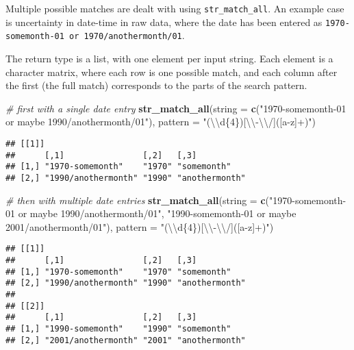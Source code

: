 \documentclass[
]{book}
\newenvironment{Shaded}{}{}
\newcommand{\CharTok}[1]{\textcolor[rgb]{0.25,0.44,0.63}{#1}}
\newcommand{\CommentTok}[1]{\textcolor[rgb]{0.38,0.63,0.69}{\textit{#1}}}
\newcommand{\DataTypeTok}[1]{\textcolor[rgb]{0.56,0.13,0.00}{#1}}
\newcommand{\KeywordTok}[1]{\textcolor[rgb]{0.00,0.44,0.13}{\textbf{#1}}}
\newcommand{\NormalTok}[1]{#1}
\newcommand{\StringTok}[1]{\textcolor[rgb]{0.25,0.44,0.63}{#1}}
\begin{document}
Multiple possible matches are dealt with using \texttt{str\_match\_all}. An example case is uncertainty in date-time in raw data, where the date has been entered as \texttt{1970-somemonth-01\ or\ 1970/anothermonth/01}.

The return type is a list, with one element per input string. Each element is a character matrix, where each row is one possible match, and each column after the first (the full match) corresponds to the parts of the search pattern.

\begin{Shaded}
\begin{Highlighting}[]
\CommentTok{# first with a single date entry}
\KeywordTok{str_match_all}\NormalTok{(}\DataTypeTok{string =} \KeywordTok{c}\NormalTok{(}\StringTok{"1970-somemonth-01 or maybe 1990/anothermonth/01"}\NormalTok{),}
              \DataTypeTok{pattern =} \StringTok{"(}\CharTok{\textbackslash{}\textbackslash{}}\StringTok{d\{4\})[}\CharTok{\textbackslash{}\textbackslash{}}\StringTok{-}\CharTok{\textbackslash{}\textbackslash{}}\StringTok{/]([a-z]+)"}\NormalTok{)}
\end{Highlighting}
\end{Shaded}

\begin{verbatim}
## [[1]]
##      [,1]                [,2]   [,3]          
## [1,] "1970-somemonth"    "1970" "somemonth"   
## [2,] "1990/anothermonth" "1990" "anothermonth"
\end{verbatim}

\begin{Shaded}
\begin{Highlighting}[]
\CommentTok{# then with multiple date entries}
\KeywordTok{str_match_all}\NormalTok{(}\DataTypeTok{string =} \KeywordTok{c}\NormalTok{(}\StringTok{"1970-somemonth-01 or maybe 1990/anothermonth/01"}\NormalTok{,}
                         \StringTok{"1990-somemonth-01 or maybe 2001/anothermonth/01"}\NormalTok{),}
              \DataTypeTok{pattern =} \StringTok{"(}\CharTok{\textbackslash{}\textbackslash{}}\StringTok{d\{4\})[}\CharTok{\textbackslash{}\textbackslash{}}\StringTok{-}\CharTok{\textbackslash{}\textbackslash{}}\StringTok{/]([a-z]+)"}\NormalTok{)}
\end{Highlighting}
\end{Shaded}

\begin{verbatim}
## [[1]]
##      [,1]                [,2]   [,3]          
## [1,] "1970-somemonth"    "1970" "somemonth"   
## [2,] "1990/anothermonth" "1990" "anothermonth"
## 
## [[2]]
##      [,1]                [,2]   [,3]          
## [1,] "1990-somemonth"    "1990" "somemonth"   
## [2,] "2001/anothermonth" "2001" "anothermonth"
\end{verbatim}
\end{document}
